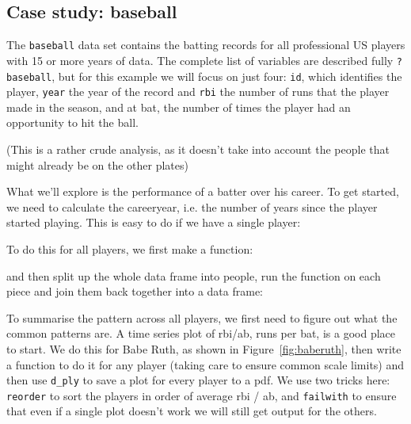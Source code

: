 \documentclass{scrartcl}
\begin{document}
\subsection{Case study: baseball}

The {\tt baseball} data set contains the batting records for all professional US players with 15 or more years of data.  The complete list of variables are described fully {\tt ?baseball}, but for this example we will focus on just four: {\tt id}, which identifies the player, {\tt year} the year of the record and {\tt rbi} the number of runs that the player made in the season, and {\tt} at bat, the number of times the player had an opportunity to hit the ball.

(This is a rather crude analysis, as it doesn't take into account the people that might already be on the other plates)

What we'll explore is the performance of a batter over his career.  To get started, we need to calculate the careeryear, i.e. the number of years since the player started playing.  This is easy to do if we have a single player:

% 


To do this for all players, we first make a function:

% 


\noindent and then split up the whole data frame into people, run the function on each piece and join them back together into a data frame:

% 


To summarise the pattern across all players, we first need to figure out what the common patterns are.  A time series plot of rbi/ab, runs per bat, is a good place to start.  We do this for Babe Ruth, as shown in Figure~\ref{fig:baberuth}, then write a function to do it for any player (taking care to ensure common scale limits) and then use {\tt d\_ply} to save a plot for every player to a pdf.  We use two tricks here: {\tt reorder} to sort the players in order of average rbi / ab, and {\tt failwith} to ensure that even if a single plot doesn't work we will still get output for the others.
\end{document}
